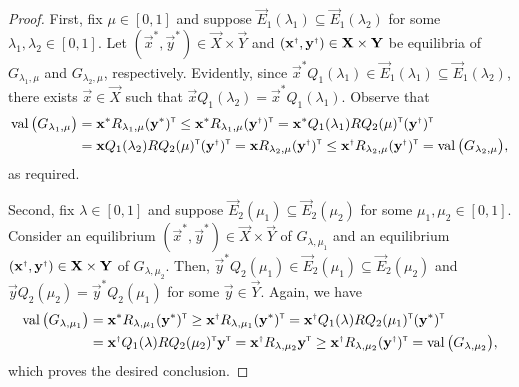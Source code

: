     \begin{proof}
        First, fix $\mu \in [0, 1]$ and suppose $\vec{E}_1(\lambda_1) \subseteq \vec{E}_1(\lambda_2)$ for some $\lambda_1, \lambda_2 \in [0, 1]$.
        Let $(\vec{x}^*, \vec{y}^*) \in \vec{X} \times \vec{Y}$ and $(\vec{x}^\sdagger, \vec{y}^\sdagger) \in \vec{X} \times \vec{Y}$ be equilibria of $G_{\lambda_1, \mu}$ and $G_{\lambda_2, \mu}$, respectively.
        Evidently, since $\vec{x}^* Q_1(\lambda_1) \in \vec{E}_1(\lambda_1) \subseteq \vec{E}_1(\lambda_2)$, there exists $\vec{x} \in \vec{X}$ such that $\vec{x} Q_1(\lambda_2) = \vec{x}^* Q_1(\lambda_1)$.
        Observe that
        \begin{equation} \label{temp:comparable-skill-inequality-1}
        \begin{split}
        \val\big(G_{\lambda_1, \mu}\big)
            & = \vec{x}^* R_{\lambda_1, \mu} (\vec{y}^*)^\transp
            \le \vec{x}^* R_{\lambda_1, \mu} (\vec{y}^\sdagger)^\transp
            = \vec{x}^* Q_1(\lambda_1) R Q_2(\mu)^\transp (\vec{y}^\sdagger)^\transp \\
            & = \vec{x} Q_1(\lambda_2) R Q_2(\mu)^\transp (\vec{y}^\sdagger)^\transp
            = \vec{x} R_{\lambda_2, \mu} (\vec{y}^\sdagger)^\transp
            \le \vec{x}^\sdagger R_{\lambda_2, \mu} (\vec{y}^\sdagger)^\transp
            = \val\big(G_{\lambda_2, \mu}\big),
        \end{split}
        \end{equation}
        as required.

        Second, fix $\lambda \in [0, 1]$ and suppose $\vec{E}_2(\mu_1) \subseteq \vec{E}_2(\mu_2)$ for some $\mu_1, \mu_2 \in [0, 1]$.
        Consider an equilibrium $(\vec{x}^*, \vec{y}^*) \in \vec{X} \times \vec{Y}$ of $G_{\lambda, \mu_1}$ and an equilibrium $(\vec{x}^\sdagger, \vec{y}^\sdagger) \in \vec{X} \times \vec{Y}$ of $G_{\lambda, \mu_2}$.
        Then, $\vec{y}^* Q_2(\mu_1) \in \vec{E}_2(\mu_1) \subseteq \vec{E}_2(\mu_2)$ and $\vec{y} Q_2(\mu_2) = \vec{y}^* Q_2(\mu_1)$ for some $\vec{y} \in \vec{Y}$.
        Again, we have
        \begin{equation} \label{temp:comparable-skill-inequality-2}
        \begin{split}
            \val\big(G_{\lambda, \mu_1}\big)
                & = \vec{x}^* R_{\lambda, \mu_1} (\vec{y}^*)^\transp
                \ge \vec{x}^\sdagger R_{\lambda, \mu_1} (\vec{y}^*)^\transp
                = \vec{x}^\sdagger Q_1(\lambda) R Q_2(\mu_1)^\transp (\vec{y}^*)^\transp \\
                & = \vec{x}^\sdagger Q_1(\lambda) R Q_2(\mu_2)^\transp \vec{y}^\transp
                = \vec{x}^\sdagger R_{\lambda, \mu_2} \vec{y}^\transp
                \ge \vec{x}^\sdagger R_{\lambda, \mu_2} (\vec{y}^\sdagger)^\transp
                = \val\big(G_{\lambda, \mu_2}\big),
        \end{split}
        \end{equation}
        which proves the desired conclusion.
    \end{proof}

